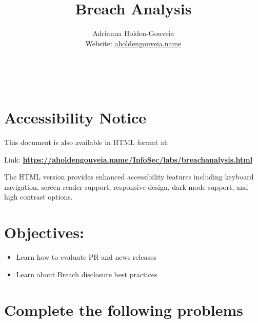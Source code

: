 \documentclass[12pt]{article}
\title{Breach Analysis}
\author{
        Adrianna Holden-Gouveia \\
        Website: \href{https://aholdengouveia.name}{aholdengouveia.name}\\ 
        \date{\vspace{-5ex}}
        \faGithub {: aholdengouveia} \\
        \faTwitter {: aholdengouveia} \\
        }
\begin{document}
    

\maketitle

\section*{Accessibility Notice}
This document is also available in HTML format at:

Link: \href{https://aholdengouveia.name/InfoSec/labs/breachanalysis.html}{\textbf{https://aholdengouveia.name/InfoSec/labs/breachanalysis.html}}

The HTML version provides enhanced accessibility features including keyboard navigation, screen reader support, responsive design, dark mode support, and high contrast options.



\section*{Objectives:}
\begin{itemize}
    \item Learn how to evaluate PR and news releases
    \item Learn about Breach disclosure best practices
\end{itemize}
\section*{Complete the following problems}

\end{document}
